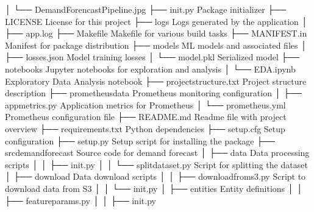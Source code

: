 \documentclass[letterpaper,10pt,english]{sphinxmanual}
\begin{document}
\begin{sphinxVerbatim}[commandchars=\\\{\}]
│   └── Demand\PYGZus{}Forencast\PYGZus{}Pipeline.jpg
├── \PYGZus{}\PYGZus{}init\PYGZus{}\PYGZus{}.py            \PYGZlt{}\PYGZhy{}\PYGZhy{}\PYGZhy{} Package initializer
├── LICENSE                \PYGZlt{}\PYGZhy{}\PYGZhy{}\PYGZhy{} License for this project
├── logs                   \PYGZlt{}\PYGZhy{}\PYGZhy{}\PYGZhy{} Logs generated by the application
│   ├── app.log
├── Makefile               \PYGZlt{}\PYGZhy{}\PYGZhy{}\PYGZhy{} Makefile for various build tasks
├── MANIFEST.in            \PYGZlt{}\PYGZhy{}\PYGZhy{}\PYGZhy{} Manifest for package distribution
├── models                 \PYGZlt{}\PYGZhy{}\PYGZhy{}\PYGZhy{} ML models and associated files
│   ├── losses.json            \PYGZlt{}\PYGZhy{}\PYGZhy{}\PYGZhy{} Model training losses
│   └── model.pkl              \PYGZlt{}\PYGZhy{}\PYGZhy{}\PYGZhy{} Serialized model
├── notebooks              \PYGZlt{}\PYGZhy{}\PYGZhy{}\PYGZhy{} Jupyter notebooks for exploration and analysis
│   └── EDA.ipynb              \PYGZlt{}\PYGZhy{}\PYGZhy{}\PYGZhy{} Exploratory Data Analysis notebook
├── project\PYGZus{}structure.txt  \PYGZlt{}\PYGZhy{}\PYGZhy{}\PYGZhy{} Project structure description
├── prometheus\PYGZus{}data        \PYGZlt{}\PYGZhy{}\PYGZhy{}\PYGZhy{} Prometheus monitoring configuration
│   ├── app\PYGZus{}metrics.py         \PYGZlt{}\PYGZhy{}\PYGZhy{}\PYGZhy{} Application metrics for Prometheus
│   └── prometheus.yml         \PYGZlt{}\PYGZhy{}\PYGZhy{}\PYGZhy{} Prometheus configuration file
├── README.md              \PYGZlt{}\PYGZhy{}\PYGZhy{}\PYGZhy{} Readme file with project overview
├── requirements.txt       \PYGZlt{}\PYGZhy{}\PYGZhy{}\PYGZhy{} Python dependencies
├── setup.cfg              \PYGZlt{}\PYGZhy{}\PYGZhy{}\PYGZhy{} Setup configuration
├── setup.py               \PYGZlt{}\PYGZhy{}\PYGZhy{}\PYGZhy{} Setup script for installing the package
├── src\PYGZus{}demand\PYGZus{}forecast    \PYGZlt{}\PYGZhy{}\PYGZhy{}\PYGZhy{} Source code for demand forecast
│   ├── data                   \PYGZlt{}\PYGZhy{}\PYGZhy{}\PYGZhy{} Data processing scripts
│   │   ├── \PYGZus{}\PYGZus{}init\PYGZus{}\PYGZus{}.py
│   │   └── split\PYGZus{}dataset.py   \PYGZlt{}\PYGZhy{}\PYGZhy{}\PYGZhy{} Script for splitting the dataset
│   ├── download               \PYGZlt{}\PYGZhy{}\PYGZhy{}\PYGZhy{} Data download scripts
│   │   ├── download\PYGZus{}from\PYGZus{}s3.py\PYGZlt{}\PYGZhy{}\PYGZhy{}\PYGZhy{} Script to download data from S3
│   │   └── \PYGZus{}\PYGZus{}init\PYGZus{}\PYGZus{}.py
│   ├── entities               \PYGZlt{}\PYGZhy{}\PYGZhy{}\PYGZhy{} Entity definitions
│   │   ├── feature\PYGZus{}params.py
│   │   ├── \PYGZus{}\PYGZus{}init\PYGZus{}\PYGZus{}.py

\end{sphinxVerbatim}
\end{document}
